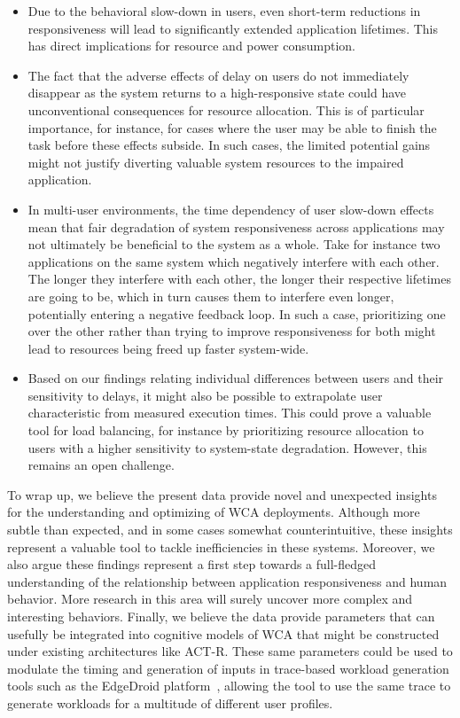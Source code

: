 \documentclass[10pt,letterpaper]{article}
\begin{document}
\begin{itemize}

  \item Due to the behavioral slow-down in users, even short-term reductions in responsiveness will lead to significantly extended application lifetimes.
  This has direct implications for resource and power consumption.
  
  \item The fact that the adverse effects of delay on users do not immediately disappear as the system returns to a high-responsive state could have unconventional consequences for resource allocation.
  This is of particular importance, for instance, for cases where the user may be able to finish the task before these effects subside.
  In such cases, the limited potential gains might not justify diverting valuable system resources to the impaired application.

  \item In multi-user environments, the time dependency of user slow-down effects mean that fair degradation of system responsiveness across applications may not ultimately be beneficial to the system as a whole.
  Take for instance two applications on the same system which negatively interfere with each other. 
  The longer they interfere with each other, the longer their respective lifetimes are going to be, which in turn causes them to interfere even longer, potentially entering a negative feedback loop. 
  In such a case, prioritizing one over the other rather than trying to improve responsiveness for both might lead to resources being freed up faster system-wide.

  \item Based on our findings relating individual differences between users and their sensitivity to delays, it might also be possible to extrapolate user characteristic from measured execution times.
  This could prove a valuable tool for load balancing, for instance by prioritizing resource allocation to users with a higher sensitivity to system-state degradation.
  However, this remains an open challenge.

\end{itemize}

To wrap up, we believe the present data provide novel and unexpected insights for the understanding and optimizing of WCA deployments.
Although more subtle than expected, and in some cases somewhat counterintuitive, these insights represent a valuable tool to tackle inefficiencies in these systems.
Moreover, we also argue these findings represent a first step towards a full-fledged understanding of the relationship between application responsiveness and human behavior.
More research in this area will surely uncover more complex and interesting behaviors.
Finally, we believe the data provide parameters that can usefully be integrated into cognitive models of WCA that might be constructed under existing architectures like ACT-R.
These same parameters could be used to modulate the timing and generation of inputs in trace-based workload generation tools such as the EdgeDroid platform~\autocite{olguin:2018,olguin:2019}, allowing the tool to use the same trace to generate workloads for a multitude of different user profiles.
\end{document}
